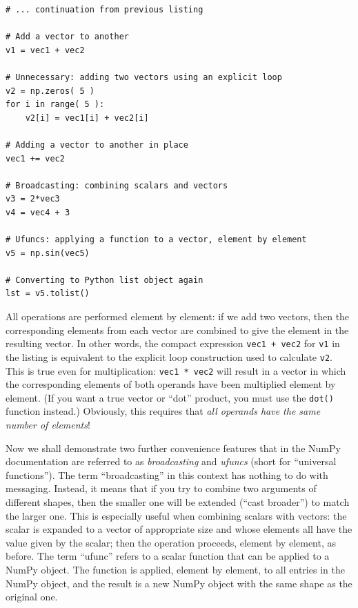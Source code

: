 \begin{verbatim}
# ... continuation from previous listing

# Add a vector to another
v1 = vec1 + vec2

# Unnecessary: adding two vectors using an explicit loop
v2 = np.zeros( 5 )
for i in range( 5 ):
    v2[i] = vec1[i] + vec2[i]

# Adding a vector to another in place
vec1 += vec2

# Broadcasting: combining scalars and vectors
v3 = 2*vec3
v4 = vec4 + 3

# Ufuncs: applying a function to a vector, element by element
v5 = np.sin(vec5)

# Converting to Python list object again
lst = v5.tolist()
\end{verbatim}

All operations are performed element by element: if we add two
vectors, then the corresponding elements from each vector are combined
to give the element in the resulting vector. In other words, the
compact expression \texttt{vec1 + vec2} for \texttt{v1} in the listing
is equivalent to the explicit loop construction used to calculate
\texttt{v2}. This is true even for multiplication: \texttt{vec1 *
  vec2} will result in a vector in which the corresponding elements of
both operands have been multiplied element by element. (If you want a
true vector or ``dot'' product, you must use the \texttt{dot()}
function instead.) Obviously, this requires that \emph{all operands
  have the same number of elements}!

Now we shall demonstrate two further convenience features that in the
NumPy documentation are referred to as \emph{broadcasting}  and
\emph{ufuncs} (short for ``universal functions'').  The term
``broadcasting'' in this context has nothing to do with messaging.
Instead, it means that if you try to combine two arguments of
different shapes, then the smaller one will be extended (``cast
broader'') to match the larger one. This is especially useful when
combining scalars with vectors: the scalar is expanded to a vector of
appropriate size and whose elements all have the value given by the
scalar; then the operation proceeds, element by element, as before.
The term ``ufunc'' refers to a scalar function that can be applied to
a NumPy object. The function is applied,\vadjust{\pagebreak} element by element, to all
entries in the NumPy object, and the result is a new NumPy object with
the same shape as the original one.

